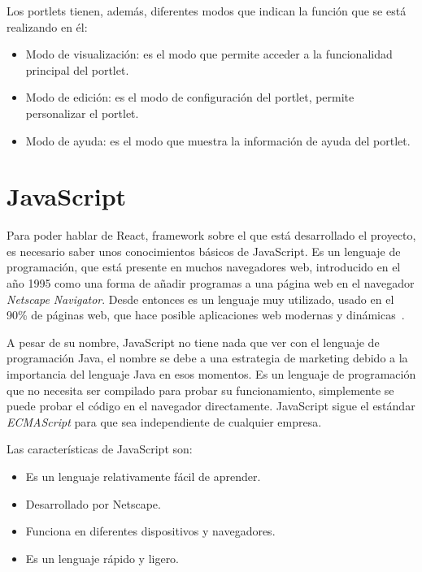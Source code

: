 \documentclass[a4paper, 12pt]{book}
\begin{document}
Los portlets tienen, además, diferentes modos que indican la función que se está realizando en él:
\begin{itemize}
\item Modo de visualización: es el modo que permite acceder a la funcionalidad principal del portlet.
\item Modo de edición: es el modo de configuración del portlet, permite personalizar el portlet.
\item Modo de ayuda: es el modo que muestra la información de ayuda del portlet.
\end{itemize}



\section{JavaScript}
\label{subsec:javascript}
Para poder hablar de React, framework sobre el que está desarrollado el proyecto, es necesario saber unos conocimientos básicos de JavaScript. Es un lenguaje de programación, que está presente en muchos navegadores web, introducido en el año 1995 como una forma de añadir programas a una página web en el navegador \textit{Netscape} \textit{Navigator}. Desde entonces es un lenguaje muy utilizado, usado en el 90\% de páginas web, que hace posible aplicaciones web modernas y dinámicas~\cite{js_book}.

\vspace{5mm}
A pesar de su nombre, JavaScript no tiene nada que ver con el lenguaje de programación Java, el nombre se debe a una estrategia de marketing debido a la importancia del lenguaje Java en esos momentos. Es un lenguaje de programación que no necesita ser compilado para probar su funcionamiento, simplemente se puede probar el código en el navegador directamente. JavaScript sigue el estándar \textit{ECMAScript} para que sea independiente de cualquier empresa.

\vspace{5mm}
Las características de JavaScript son:

\begin{itemize}
\item Es un lenguaje relativamente fácil de aprender.
\item Desarrollado por Netscape.
\item Funciona en diferentes dispositivos y navegadores.
\item Es un lenguaje rápido y ligero.
\end{itemize}
\end{document}
